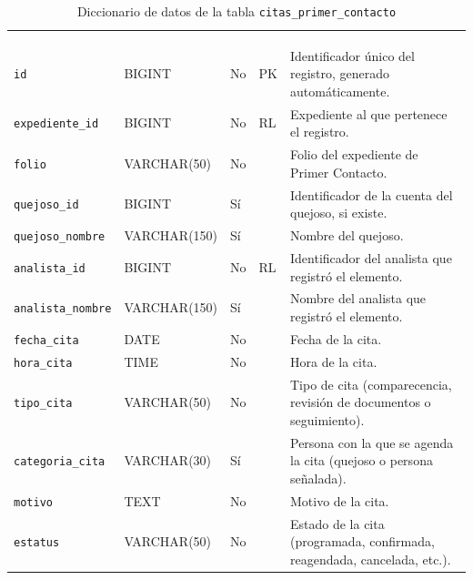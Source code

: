 \footnotesize
\renewcommand{\arraystretch}{1.15}
\setlength{\tabcolsep}{4pt}
\begin{longtable}{|L{3.9cm}|L{2.4cm}|L{0.9cm}|L{1.2cm}|L{6.6cm}|}
	\hiderowcolors\caption{Diccionario de datos de la tabla \texttt{citas\_primer\_contacto}}
	\label{tab:dic_citas_primer_contacto} \\ \showrowcolors
	\hline
	 &  &  &  &  \\
	\hline
	\endfirsthead
	\hline
	 &  &  &  &  \\
	\hline
	\endhead
		\texttt{id} & BIGINT & No & PK & Identificador único del registro, generado automáticamente. \\ \hline
		\texttt{expediente\_\allowbreak{}id} & BIGINT & No & RL & Expediente al que pertenece el registro. \\ \hline
		\texttt{folio} & VARCHAR(50) & No &  & Folio del expediente de Primer Contacto. \\ \hline
		\texttt{quejoso\_\allowbreak{}id} & BIGINT & Sí &  & Identificador de la cuenta del quejoso, si existe. \\ \hline
		\texttt{quejoso\_\allowbreak{}nombre} & VARCHAR(150) & Sí &  & Nombre del quejoso. \\ \hline
		\texttt{analista\_\allowbreak{}id} & BIGINT & No & RL & Identificador del analista que registró el elemento. \\ \hline
		\texttt{analista\_\allowbreak{}nombre} & VARCHAR(150) & Sí &  & Nombre del analista que registró el elemento. \\ \hline
		\texttt{fecha\_\allowbreak{}cita} & DATE & No &  & Fecha de la cita. \\ \hline
		\texttt{hora\_\allowbreak{}cita} & TIME & No &  & Hora de la cita. \\ \hline
		\texttt{tipo\_\allowbreak{}cita} & VARCHAR(50) & No &  & Tipo de cita (comparecencia, revisión de documentos o seguimiento). \\ \hline
		\texttt{categoria\_\allowbreak{}cita} & VARCHAR(30) & Sí &  & Persona con la que se agenda la cita (quejoso o persona señalada). \\ \hline
		\texttt{motivo} & TEXT & No &  & Motivo de la cita. \\ \hline
		\texttt{estatus} & VARCHAR(50) & No &  & Estado de la cita (programada, confirmada, reagendada, cancelada, etc.). \\ \hline

\end{longtable}

